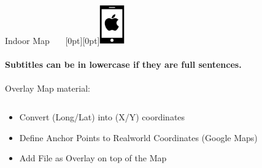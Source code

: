\documentclass[11pt]{beamer}
\begin{document}
\begin{frame}{Indoor Map ~~~\raisebox{-10pt}[0pt][0pt]{\includegraphics[width=0.08\textwidth]{tech-stack-apple}}}

\framesubtitle{Subtitles can be in lowercase if they are full sentences.}
Overlay Map material:

  \begin{columns}[T]
  \begin{column}{.6\textwidth}
  \begin{itemize}
    \item Convert (Long/Lat) into (X/Y) coordinates
    \item Define Anchor Points to Realworld Coordinates (Google Maps)
    \item Add File as Overlay on top of the Map
  \end{itemize}
  \end{column}
  \begin{column}{.4\textwidth}

\end{column}
\end{columns}
\end{frame}
\end{document}
